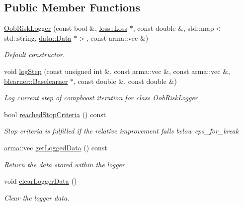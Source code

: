 \subsection*{Public Member Functions}
\begin{DoxyCompactItemize}
\item 
\mbox{\hyperlink{classlogger_1_1_oob_risk_logger_a6c4e307fe35f2c1f329b5cddc1bfe56d}{Oob\+Risk\+Logger}} (const bool \&, \mbox{\hyperlink{classloss_1_1_loss}{loss\+::\+Loss}} $\ast$, const double \&, std\+::map$<$ std\+::string, \mbox{\hyperlink{classdata_1_1_data}{data\+::\+Data}} $\ast$$>$, const arma\+::vec \&)
\begin{DoxyCompactList}\small\item\em Default constructor. \end{DoxyCompactList}\item 
void \mbox{\hyperlink{classlogger_1_1_oob_risk_logger_a948a89f02ac782c25a15c49c4a108c02}{log\+Step}} (const unsigned int \&, const arma\+::vec \&, const arma\+::vec \&, \mbox{\hyperlink{classblearner_1_1_baselearner}{blearner\+::\+Baselearner}} $\ast$, const double \&, const double \&)
\begin{DoxyCompactList}\small\item\em Log current step of compboost iteration for class {\ttfamily \mbox{\hyperlink{classlogger_1_1_oob_risk_logger}{Oob\+Risk\+Logger}}} \end{DoxyCompactList}\item 
bool \mbox{\hyperlink{classlogger_1_1_oob_risk_logger_a5c1c8358ffcb5f5463b43f068ea21aa4}{reached\+Stop\+Criteria}} () const
\begin{DoxyCompactList}\small\item\em Stop criteria is fulfilled if the relative improvement falls below {\ttfamily eps\+\_\+for\+\_\+break} \end{DoxyCompactList}\item 
arma\+::vec \mbox{\hyperlink{classlogger_1_1_oob_risk_logger_a74bfab14d3da0b10229c1ae99ab11337}{get\+Logged\+Data}} () const
\begin{DoxyCompactList}\small\item\em Return the data stored within the logger. \end{DoxyCompactList}\item 
void \mbox{\hyperlink{classlogger_1_1_oob_risk_logger_ac1d85a315dc9b6c1897a3164f4997207}{clear\+Logger\+Data}} ()
\begin{DoxyCompactList}\small\item\em Clear the logger data. \end{DoxyCompactList}\item 
$$
\end{DoxyCompactItemize}
